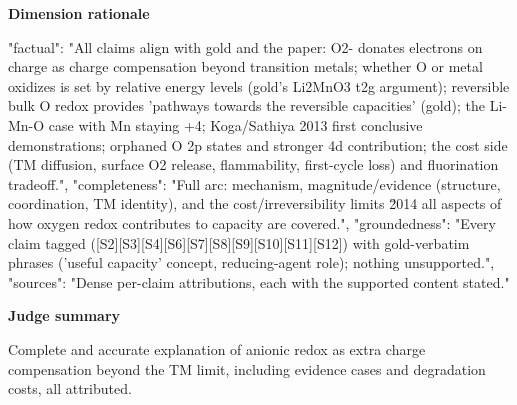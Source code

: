 \documentclass[10pt]{article}
\begin{document}
\textbf{Dimension rationale}
\begin{EvidenceText}
{
  "factual": "All claims align with gold and the paper: O2- donates electrons on charge as charge compensation beyond transition metals; whether O or metal oxidizes is set by relative energy levels (gold's Li2MnO3 t2g argument); reversible bulk O redox provides 'pathways towards the reversible capacities' (gold); the Li-Mn-O case with Mn staying +4; Koga/Sathiya 2013 first conclusive demonstrations; orphaned O 2p states and stronger 4d contribution; the cost side (TM diffusion, surface O2 release, flammability, first-cycle loss) and fluorination tradeoff.",
  "completeness": "Full arc: mechanism, magnitude/evidence (structure, coordination, TM identity), and the cost/irreversibility limits \u2014 all aspects of how oxygen redox contributes to capacity are covered.",
  "groundedness": "Every claim tagged ([S2][S3][S4][S6][S7][S8][S9][S10][S11][S12]) with gold-verbatim phrases ('useful capacity' concept, reducing-agent role); nothing unsupported.",
  "sources": "Dense per-claim attributions, each with the supported content stated."
}
\end{EvidenceText}

\textbf{Judge summary}
\begin{EvidenceText}
Complete and accurate explanation of anionic redox as extra charge compensation beyond the TM limit, including evidence cases and degradation costs, all attributed.
\end{EvidenceText}
\end{document}
